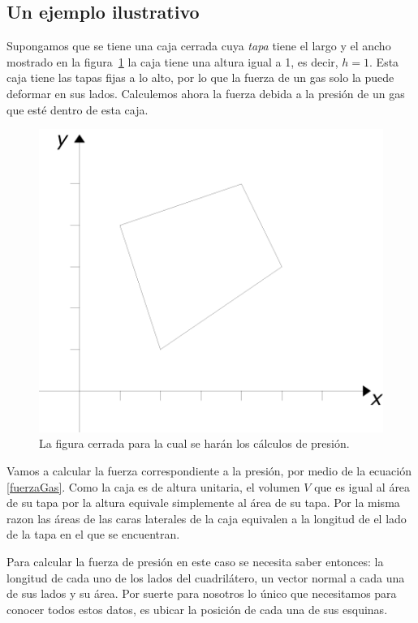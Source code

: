 \subsection{Un ejemplo ilustrativo}

Supongamos que se tiene una caja cerrada cuya \emph{tapa} tiene el largo y el ancho mostrado en la figura~\ref{cuadrilatero:fig} la caja tiene una altura igual a 1, es decir, $h=1$. Esta caja tiene las tapas fijas a lo alto, por lo que la fuerza de un gas solo la puede deformar en sus lados.
Calculemos ahora la fuerza debida a la presión de un gas que esté dentro de esta caja.

\begin{figure}
 \centering
 \includegraphics[]{Img/cuadrilatero}
 \caption[Cuadrilátero]{ 
 La figura cerrada para la cual se harán los cálculos de presión.
 } \label{cuadrilatero:fig}
\end{figure}

Vamos a calcular la fuerza correspondiente a la presión, por medio de la ecuación \ref{fuerzaGas}.
Como la caja es de altura unitaria, el volumen $V$ que es igual al área de su tapa por la altura equivale simplemente al área de su tapa.
Por la misma razon las áreas de las caras laterales de la caja equivalen a la longitud de el lado de la tapa en el que se encuentran.

Para calcular la fuerza de presión en este caso se necesita saber entonces: la longitud de cada uno de los lados del cuadrilátero, un vector normal a cada una de sus lados y su área.
Por suerte para nosotros lo único que necesitamos para conocer todos estos datos, es ubicar la posición de cada una de sus esquinas.

